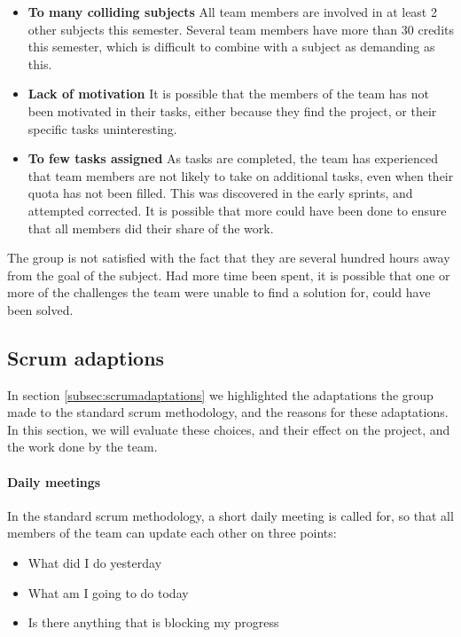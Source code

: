 \documentclass[11pt,a4paper,titlepage,oneside]{report}
\begin{document}
\begin{itemize}
\item \textbf{To many colliding subjects} All team members are involved in at least 2 other subjects this semester. Several team members have more than 30 credits this semester, which is difficult to combine with a subject as demanding as this.
\item \textbf{Lack of motivation} It is possible that the members of the team has not been motivated in their tasks, either because they find the project, or their specific tasks uninteresting. 
\item \textbf{To few tasks assigned} As tasks are completed, the team has experienced that team members are not likely to take on additional tasks, even when their quota has not been filled. This was discovered in the early sprints, and attempted corrected. It is possible that more could have been done to ensure that all members did their share of the work.
\end{itemize}

The group is not satisfied with the fact that they are several hundred hours away from the goal of the subject. Had more time been spent, it is possible that one or more of the challenges the team were unable to find a solution for, could have been solved. 


\subsection{Scrum adaptions}
\label{subsec:ScrumAdaptationsEval}
In section \ref{subsec:scrumadaptations} we highlighted the adaptations the group made to the standard scrum methodology, and the reasons for these adaptations. In this section, we will evaluate these choices, and their effect on the project, and the work done by the team. 
\paragraph{Daily meetings}
In the standard scrum methodology, a short daily meeting is called for, so that all members of the team can update each other on three points:

\begin{itemize}
\item What did I do yesterday
\item What am I going to do today
\item Is there anything that is blocking my progress
\end{itemize}
\end{document}
